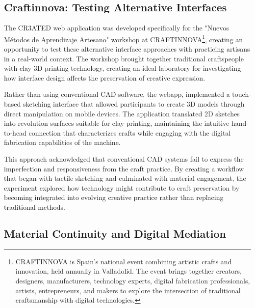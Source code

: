 \subsection{Craftinnova: Testing Alternative Interfaces}

The CR3ATED web application was developed specifically for the "Nuevos Métodos de Aprendizaje Artesano" workshop at CRAFTINNOVA\footnote{CRAFTINNOVA is Spain's national event combining artistic crafts and innovation, held annually in Valladolid. The event brings together creators, designers, manufacturers, technology experts, digital fabrication professionals, artists, entrepreneurs, and makers to explore the intersection of traditional craftsmanship with digital technologies.}, creating an opportunity to test these alternative interface approaches with practicing artisans in a real-world context. The workshop brought together traditional craftspeople with clay 3D printing technology, creating an ideal laboratory for investigating how interface design affects the preservation of creative expression.

\vspace{0.5cm}

Rather than using conventional CAD software, the webapp, implemented a touch-based sketching interface that allowed participants to create 3D models through direct manipulation on mobile devices. The application translated 2D sketches into revolution surfaces suitable for clay printing, maintaining the intuitive hand-to-head connection that characterizes crafts while engaging with the digital fabrication capabilities of the machine.

\vspace{0.5cm}

This approach acknowledged that conventional CAD systems fail to express the imperfection and responsiveness from the craft practice. By creating a workflow that began with tactile sketching and culminated with material engagement, the experiment explored how technology might contribute to craft preservation by becoming integrated into evolving creative practice rather than replacing traditional methods.

\subsection{Material Continuity and Digital Mediation}













